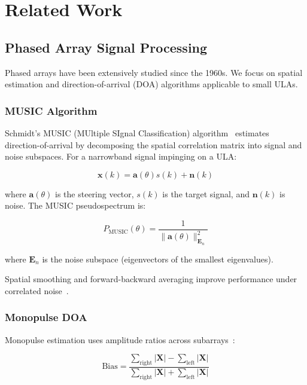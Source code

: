 \documentclass[10pt,a4paper]{article}
\begin{document}
\section{Related Work}
\label{sec:related}

\subsection{Phased Array Signal Processing}

Phased arrays have been extensively studied since the 1960s. We focus on spatial estimation
and direction-of-arrival (DOA) algorithms applicable to small ULAs.

\subsubsection{MUSIC Algorithm}

Schmidt's MUSIC (MUltiple SIgnal Classification) algorithm~\cite{Schmidt1986} estimates
direction-of-arrival by decomposing the spatial correlation matrix into signal and noise subspaces.
For a narrowband signal impinging on a ULA:

\begin{equation}
\mathbf{x}(k) = \mathbf{a}(\theta) s(k) + \mathbf{n}(k)
\end{equation}

where $\mathbf{a}(\theta)$ is the steering vector, $s(k)$ is the target signal, and $\mathbf{n}(k)$
is noise. The MUSIC pseudospectrum is:

\begin{equation}
P_{\text{MUSIC}}(\theta) = \frac{1}{\|\mathbf{a}(\theta)\|_{\mathbf{E}_n}^2}
\end{equation}

where $\mathbf{E}_n$ is the noise subspace (eigenvectors of the smallest eigenvalues).

Spatial smoothing and forward-backward averaging improve performance under correlated noise~\cite{Krim1996}.

\subsubsection{Monopulse DOA}

Monopulse estimation uses amplitude ratios across subarrays~\cite{Johnson1993}:

\begin{equation}
\text{Bias} = \frac{\sum_{\text{right}} |\mathbf{X}| - \sum_{\text{left}} |\mathbf{X}|}{\sum_{\text{right}} |\mathbf{X}| + \sum_{\text{left}} |\mathbf{X}|}
\end{equation}
\end{document}
